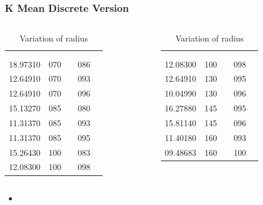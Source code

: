 \documentclass[blue]{beamer}
\begin{document}
\begin{frame}
 \frametitle{K Mean Discrete Version}
 \tiny
 \begin{columns}
   { 
   \begin{table}[H]
    \centering
    \caption{Variation of radius}
   \begin{tabular}{||l|c|c|c|c||} \hline
    {\color{red}{Radius}} & {\color{red}{K}} & {\color{red}{actual K}} & {\color{red}{red points}} \\
   & & &   {\color{red}{covered}} \\ \hline
   18.97310 & 070 & {\color{blue}{40}} & 086 \\ \hline
   12.64910 & 070 & {\color{blue}{40}} & 093 \\ \hline
   12.64910 & 070 & {\color{blue}{40}} & 096 \\ \hline \hline 
   15.13270 & 085 & {\color{blue}{44}} & 080 \\ \hline 
   11.31370 & 085 & {\color{blue}{44}} & 093 \\ \hline 
   11.31370 & 085 & {\color{blue}{44}} & 095 \\ \hline \hline 
   15.26430 & 100 & {\color{blue}{46}} & 083 \\ \hline 
   12.08300 & 100 & {\color{blue}{46}} & 098 \\ \hline \hline 
   
   \end{tabular}
  \end{table}
  }
    \begin{table}[H]
   \caption{Variation of radius}
    \begin{tabular}{||l|c|c|c|c||} \hline
    {\color{red}{Radius}} & {\color{red}{K}} & {\color{red}{actual K}} & {\color{red}{red points}} \\
     & & &   {\color{red}{covered}} \\ \hline
     12.08300 & 100 & {\color{blue}{46}} & 098 \\ \hline \hline
     12.64910 & 130 & {\color{blue}{52}} & 095 \\ \hline 
     10.04990 & 130 & {\color{blue}{52}} & 096 \\ \hline \hline
     16.27880 & 145 & {\color{blue}{53}} & 095 \\ \hline 
     15.81140 & 145 & {\color{blue}{53}} & 096 \\ \hline \hline 
     11.40180 & 160 & {\color{blue}{55}} & 093 \\ \hline 
     09.48683 & 160 & {\color{blue}{55}} & 100 \\ \hline \hline 
    \end{tabular}
  \end{table}
  \end{columns}
  \begin{itemize}
   \item {}
  \end{itemize}

 \end{frame}
\end{document}
